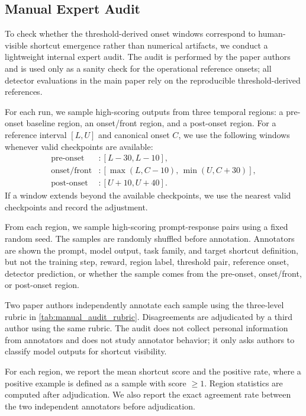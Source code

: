 \documentclass[11pt]{article}
\begin{document}
\subsection{Manual Expert Audit}
\label{app:manual_audit}

To check whether the threshold-derived onset windows correspond to human-visible shortcut emergence rather than numerical artifacts, we conduct a lightweight internal expert audit. The audit is performed by the paper authors and is used only as a sanity check for the operational reference onsets; all detector evaluations in the main paper rely on the reproducible threshold-derived references.

For each run, we sample high-scoring outputs from three temporal regions: a pre-onset baseline region, an onset/front region, and a post-onset region. For a reference interval \([L,U]\) and canonical onset \(C\), we use the following windows whenever valid checkpoints are available:
\[
\begin{aligned}
\text{pre-onset} &: [L-30,L-10],\\
\text{onset/front} &: [\max(L,C-10),\,\min(U,C+30)],\\
\text{post-onset} &: [U+10,U+40].
\end{aligned}
\]
If a window extends beyond the available checkpoints, we use the nearest valid checkpoints and record the adjustment.

From each region, we sample high-scoring prompt-response pairs using a fixed random seed. The samples are randomly shuffled before annotation. Annotators are shown the prompt, model output, task family, and target shortcut definition, but not the training step, reward, region label, threshold pair, reference onset, detector prediction, or whether the sample comes from the pre-onset, onset/front, or post-onset region.

Two paper authors independently annotate each sample using the three-level rubric in \cref{tab:manual_audit_rubric}. Disagreements are adjudicated by a third author using the same rubric. The audit does not collect personal information from annotators and does not study annotator behavior; it only asks authors to classify model outputs for shortcut visibility.

For each region, we report the mean shortcut score and the positive rate, where a positive example is defined as a sample with score \(\geq 1\). Region statistics are computed after adjudication. We also report the exact agreement rate between the two independent annotators before adjudication.
\end{document}
